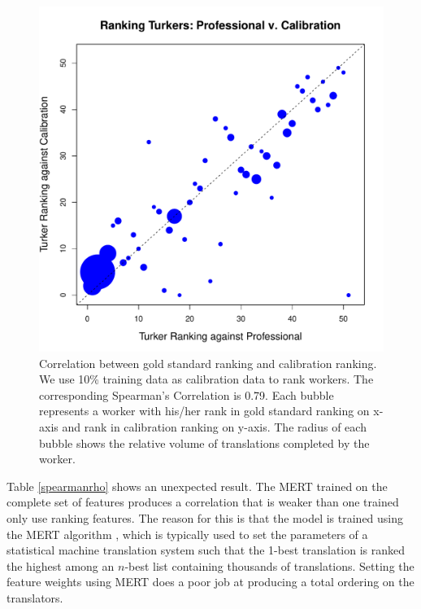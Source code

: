 \documentclass[11pt]{article}
\begin{document}
\begin{figure}[h!]
  \centering
  \includegraphics[width=\linewidth]{OnlyCali/calirankingorder.pdf}
  \caption{Correlation between gold standard ranking and calibration ranking. We use 10\% training data as calibration data to rank workers. The corresponding Spearman's Correlation is 0.79. Each bubble represents a worker with his/her rank in gold standard ranking on x-axis and rank in calibration ranking on y-axis. The radius of each bubble shows the relative volume of translations completed by the worker.  }
    \label{fdtallwocalbutbilinorder}
\end{figure}

Table \ref{spearmanrho} shows an unexpected result.  The MERT trained on the complete set of features produces a correlation that is weaker than one trained only use ranking features.  The reason for this is that the model is trained using the MERT algorithm \cite{och2003minimum}, which is typically used to set the parameters of a statistical machine translation system such that the 1-best translation is ranked the highest among an $n$-best list containing thousands of translations. 
Setting the feature weights using MERT does a poor job at producing a total ordering on the translators. 
\end{document}
